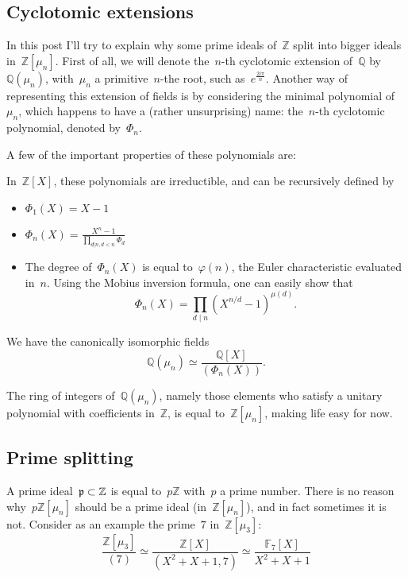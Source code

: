 \subsection{Cyclotomic extensions}

In this post I'll try to explain why some prime ideals of~${\mathbb{Z}}$ split into bigger ideals in~${\mathbb{Z}[\mu_n]}$. First of all, we will denote the~${n}$-th cyclotomic extension of~${\mathbb{Q}}$ by~${\mathbb{Q}(\mu_n)}$, with~${\mu_n}$ a primitive~${n}$-the root, such as~${e^{\frac{2i\pi}{n}}}$. Another way of representing this extension of fields is by considering the minimal polynomial of~${\mu_n}$, which happens to have a (rather unsurprising) name: the~${n}$-th cyclotomic polynomial, denoted by~${\Phi_n}$.

A few of the important properties of these polynomials are:

In~${\mathbb{Z}[X]}$, these polynomials are irreductible, and can be recursively defined by
\begin{itemize}
	\item $ \Phi_1(X) = X - 1~$
	\item $ \Phi_n(X) = \frac{X^n - 1}{\prod_{d|n, d < n}\Phi_d}~$
	\item The degree of~${\Phi_n(X)}$ is equal to~${\varphi(n)}$, the Euler characteristic evaluated in~${n}$. Using the Mobius inversion formula, one can easily show that
    \begin{equation}
      \Phi_n(X) = \prod_{d\mid n} \left( X^{n/d} - 1 \right)^{\mu(d)}  .
    \end{equation}
\end{itemize}

We have the canonically isomorphic fields
\begin{equation}
  \mathbb{Q}(\mu_n) \simeq \frac{\mathbb{Q}[X]}{(\Phi_n(X))} .
\end{equation}

The ring of integers of~${\mathbb{Q}(\mu_n)}$, namely those elements who satisfy a unitary polynomial with coefficients in~${\mathbb{Z}}$, is equal to~${\mathbb{Z}[\mu_n]}$, making life easy for now.

\subsection{Prime splitting}

A prime ideal~${\frak{p} \subset \mathbb{Z} }$ is equal to~${p\mathbb{Z}}$ with~${p}$ a prime number. There is no reason why~${p\mathbb{Z}[\mu_n]}$ should be a prime ideal (in~${\mathbb{Z}[\mu_n]}$), and in fact sometimes it is not. Consider as an example the prime~${7}$ in~${\mathbb{Z}[\mu_3]}$:
\begin{equation}
  \frac{\mathbb{Z}[\mu_3]}{(7)} \simeq \frac{\mathbb{Z}[X]}{(X^2 + X + 1, 7)} \simeq \frac{\mathbb{F}_7[X]}{X^2 + X + 1}
\end{equation}

